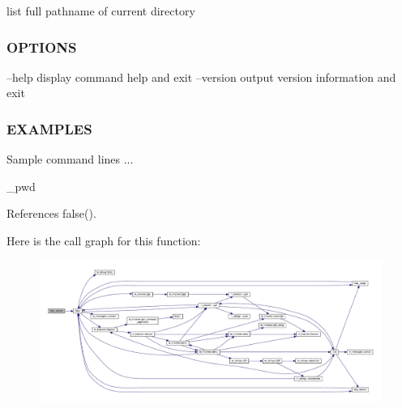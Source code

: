 list full pathname of current directory \subsubsection*{O\+P\+T\+I\+O\+NS}

--help display command help and exit --version output version information and exit \subsubsection*{E\+X\+A\+M\+P\+L\+ES}

Sample command lines ... \begin{DoxyVerb}   _pwd \end{DoxyVerb}
 

References false().

Here is the call graph for this function\+:
\nopagebreak
\begin{figure}[H]
\begin{center}
\leavevmode
\includegraphics[width=350pt]{__pwd_8f90_a39c21619b08a3c22f19e2306efd7f766_cgraph}
\end{center}
\end{figure}
